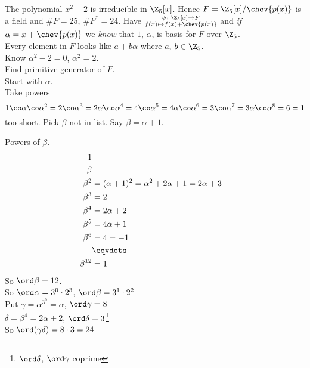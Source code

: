 \eg The polynomial $x^2-2$ is irreducible in $\Z_5[x]$. %
Hence $F=\Z_5[x]/\chev{p(x)}$ is a field and $\#F=25$, $\#F^*=24$.  Have $\substack{\phi\colon\Z_5[x]\to F\\f(x)\mapsto f(x)+\chev{p(x)}}$ and \emph{if} $\alpha=x+\chev{p(x)}$ we \emph{know} that $1$, $\alpha$, is basis for $F$ over $\Z_5$. \\
Every element in $F$ looks like $a+b\alpha$ where $a$, $b\in\Z_5$. \\
Know $\alpha^2-2=0$, $\alpha^2=2$. \\
Find primitive generator of $F$. \\
Start with $\alpha$. \\
Take powers
\[ 1\co\alpha\co\alpha^2=2\co\alpha^3=2\alpha\co\alpha^4=4\co\alpha^5=4\alpha\co\alpha^6=3\co\alpha^7=3\alpha\co\alpha^8=6=1 \]
too short.  Pick $\beta$ not in list.  Say $\beta=\alpha+1$.

Powers of $\beta$.
\begin{align*}
1 \\
\beta \\
\beta^2 &= (\alpha+1)^2 = \alpha^2 + 2\alpha + 1 = 2\alpha + 3 \\
\beta^3 &= 2 \\
\beta^4 &= 2\alpha + 2 \\
\beta^5 &= 4\alpha + 1 \\
\beta^6 &= 4 = -1 \\
&\eqvdots \\
\beta^{12} &= 1
\end{align*}
So $\ord\beta=12$. \\
So $\ord\alpha=3^0\cdot2^3$, $\ord\beta=3^1 \cdot 2^2$ \\
Put $\gamma=\alpha^{3^0}=\alpha$, $\ord\gamma=8$ \\
\phantom{Put }$\delta = \beta^4 = 2\alpha+2$, $\ord\delta=3$\footnote{$\ord\delta$, $\ord\gamma$ coprime} \\
So $\ord(\gamma\delta)=8\cdot3=24$
